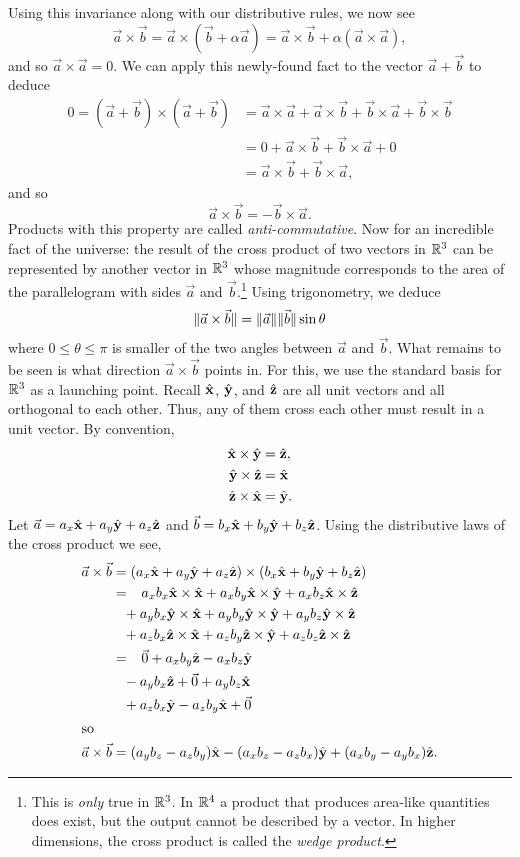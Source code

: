 Using this invariance along with our distributive rules,
we now see
\[
	\vec a\times \vec b = \vec a\times (\vec b+\alpha\vec a)=
	\vec a\times \vec b+\alpha(\vec a\times\vec a),
\]
and so $\vec a\times \vec a=0$.  We can apply this newly-found fact to
the vector $\vec a+\vec b$ to deduce
\begin{align*}
	0=(\vec a+\vec b)\times (\vec a+\vec b)&=
	\vec a\times \vec a+\vec a\times\vec b+\vec b\times \vec a+\vec b\times \vec b\\
	&=0+\vec a\times \vec b+\vec b\times \vec a+0\\
	&=\vec a\times \vec b+\vec b\times \vec a,
\end{align*}
and so 
\[
	\vec a\times \vec b=-\vec b\times \vec a.
\]
Products with this property are called \emph{anti-commutative}.  Now
for an incredible fact of the universe: the result of the cross product of
two vectors in $\mathbb{R}^3$ can be represented by another vector in $\mathbb{R}^3$ whose magnitude
corresponds to the area of the parallelogram
with sides $\vec a$ and $\vec b$.\footnote{ This is \emph{only} true in $\mathbb{R}^3$.  In $\mathbb{R}^4$ a product that
produces area-like quantities does exist, but the output cannot be described by
a vector.  In higher dimensions, the cross product is called the \emph{wedge product}.}
Using trigonometry, we deduce
\[
	\lVert\vec a\times \vec b\rVert=\lVert\vec a\rVert\lVert\vec b\rVert\sin \theta
\]
where $0\leq \theta\leq \pi$ is smaller of the two angles between $\vec a$ and $\vec b$.
What remains to be seen is what direction $\vec a\times \vec b$ points in.  For this,
we use the standard basis for $\mathbb{R}^3$ as a launching point. Recall
${\hat {\mathbf x}}$, ${\hat {\mathbf y}}$, and ${\hat {\mathbf z}}$ are all unit vectors and all orthogonal to each other.
Thus, any of them cross each other must result in a unit vector.  By convention,
\begin{align*}
	{\hat {\mathbf x}}\times{\hat {\mathbf y}} &=  {\hat {\mathbf z}}, \\
	{\hat {\mathbf y}}\times{\hat {\mathbf z}} &=  {\hat {\mathbf x}}\\
	{\hat {\mathbf z}}\times{\hat {\mathbf x}} &=  {\hat {\mathbf y}}.
\end{align*}
Let $\vec a=a_x{\hat {\mathbf x}} +a_y{\hat {\mathbf y}} +a_z{\hat {\mathbf z}}$ and $\vec b=b_x{\hat {\mathbf x}} +b_y{\hat {\mathbf y}} +b_z{\hat {\mathbf z}}$.
Using the distributive laws of the cross product we see,
\begin{align*}
	\vec a\times\vec b &= (a_x {\hat {\mathbf x}} + a_y{\hat {\mathbf y}} + a_z{\hat {\mathbf z}}) \times (b_x{\hat {\mathbf x}} + b_y{\hat {\mathbf y}} + b_z{\hat {\mathbf z}}) \\
	&= \phantom{+}a_xb_x{\hat {\mathbf x}}\times{\hat {\mathbf x}} + a_xb_y{\hat {\mathbf x}}\times{\hat {\mathbf y}} + a_xb_z{\hat {\mathbf x}}\times{\hat {\mathbf z}} \\
       &\phantom{=}+ a_yb_x{\hat {\mathbf y}}\times{\hat {\mathbf x}} + a_yb_y{\hat {\mathbf y}}\times{\hat {\mathbf y}} + a_yb_z{\hat {\mathbf y}}\times{\hat {\mathbf z}} \\
       &\phantom{=}+ a_zb_x{\hat {\mathbf z}}\times{\hat {\mathbf x}} + a_zb_y{\hat {\mathbf z}}\times{\hat {\mathbf y}} + a_zb_z{\hat {\mathbf z}}\times{\hat {\mathbf z}} \\
	&= \phantom{+}\vec 0  + a_xb_y{\hat {\mathbf z}} - a_xb_z{\hat {\mathbf y}} \\
       &\phantom{=}- a_yb_x{\hat {\mathbf z}} + \vec 0 + a_yb_z {\hat {\mathbf x}} \\
	&\phantom{=}+ a_zb_x{\hat {\mathbf y}} - a_zb_y{\hat {\mathbf x}} + {\vec 0}\\
\intertext{so}
\vec a\times \vec b &= (a_yb_z - a_zb_y){\hat {\mathbf x}} - (a_xb_z - a_zb_x){\hat {\mathbf y}} + (a_xb_y - a_yb_x){\hat {\mathbf z}}.
\end{align*}

